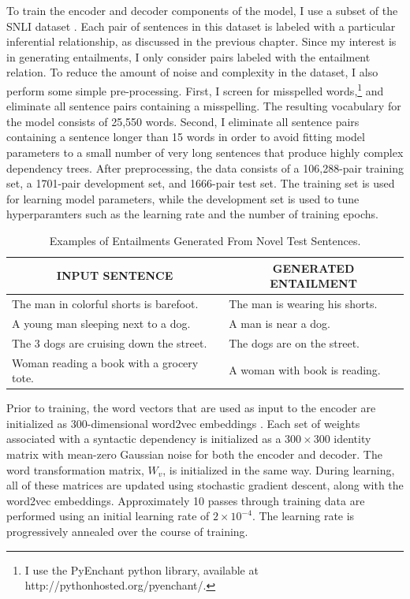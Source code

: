 To train the encoder and decoder components of the model, I use a subset of the SNLI dataset \citep{Bowman:2015}. Each pair of sentences in this dataset is labeled with a particular inferential relationship, as discussed in the previous chapter. Since my interest is in generating entailments, I only consider pairs labeled with the entailment relation. To reduce the amount of noise and complexity in the dataset, I also perform some simple pre-processing. First, I screen for misspelled words,\footnote{I use the PyEnchant python library, available at http://pythonhosted.org/pyenchant/.} and eliminate all sentence pairs containing a misspelling. The resulting vocabulary for the model consists of 25,550 words. Second, I eliminate all sentence pairs containing a sentence longer than 15 words in order to avoid fitting model parameters to a small number of very long sentences that produce highly complex dependency trees. After preprocessing, the data consists of a 106,288-pair training set, a 1701-pair development set, and 1666-pair test set. The training set is used for learning model parameters, while the development set is used to tune hyperparamters such as the learning rate and the number of training epochs.

\begin{table}[!t]
\begin{center} 

\caption{Examples of Entailments Generated From Novel Test Sentences.} 

\label{examples}
\vskip 0.06in
\setlength{\tabcolsep}{12pt}
\begin{tabular}{ll} 
\hline

\multicolumn{1}{c}{\rule{0pt}{3ex} INPUT SENTENCE} & 
\multicolumn{1}{c}{GENERATED ENTAILMENT} \\

\hline
\rule{0pt}{3ex}The man in colorful shorts is barefoot. & The man is wearing his shorts. \\
A young man sleeping next to a dog. & A man is near a dog. \\
The 3 dogs are cruising down the street. & The dogs are on the street. \\
Woman reading a book with a grocery tote. & A woman with book is reading. \\
\hline
\end{tabular}
\end{center} 
\end{table}

Prior to training, the word vectors that are used as input to the encoder are initialized as 300-dimensional word2vec embeddings \citep{Mikolov:2013}. Each set of weights associated with a syntactic dependency is initialized as a $300 \times 300$ identity matrix with mean-zero Gaussian noise for both the encoder and decoder. The word transformation matrix, $W_v$, is initialized in the same way. During learning, all of these matrices are updated using stochastic gradient descent, along with the word2vec embeddings. Approximately 10 passes through training data are performed using an initial learning rate of $2 \times 10^{-4}$. The learning rate is progressively annealed over the course of training.

